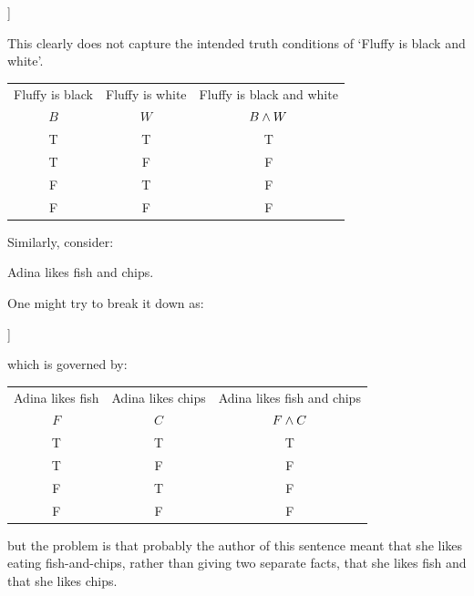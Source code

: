 	\begin{center}
		\begin{forest}
			[Fluffy is black and white\\\ldots and \ldots\\$\ldots \eand \ldots$
			[Fluffy is black\\$B$][Fluffy is white\\$W$]]
		\end{forest}
	\end{center}
	
	This clearly does not capture the intended truth conditions of `Fluffy is black and white'. 
	
	\begin{center}
		\begin{tabular}{cc|c}
			Fluffy is black&Fluffy is white&Fluffy is black and white \\
			$B$&$W$&$B\mathbin{\wedge} W$\Bstrut\\\hline\Tstrut
			T&T&T\\
			T&F&F\\
			F&T&F\\
			F&F&F
		\end{tabular}
	\end{center}

Similarly, consider:
	\begin{samplesent}
		\item Adina likes fish and chips.
	\end{samplesent}
	One might try to break it down as: 
	\begin{center}
		\begin{forest}
			[Adina likes fish and chips\\\ldots and \ldots\\$\ldots \eand \ldots$
			[Adina likes fish\\$F$][Adina likes chips\\$C$]]
		\end{forest}
	\end{center}
	which is governed by:
	\begin{center}
		\begin{tabular}{cc|c}
			Adina likes fish&Adina likes chips&Adina likes fish and chips\\
			$F$&$C$&$F\mathbin{\wedge} C$\Bstrut\\\hline\Tstrut
			T&T&T\\
			T&F&F\\
			F&T&F\\
			F&F&F
		\end{tabular}
	\end{center}
but the problem is that probably the author of this sentence meant that she likes eating fish-and-chips, rather than giving two separate facts, that she likes fish and that she likes chips. 


